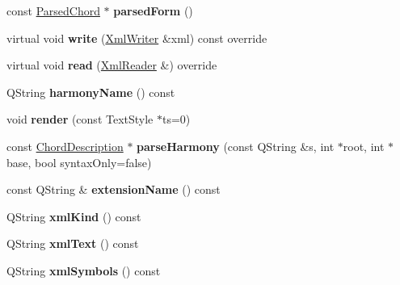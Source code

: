 \begin{DoxyCompactItemize}
\item 
\mbox{\label{class_ms_1_1_harmony_ac8c4ea2022b14c592fa6c61788785835}} 
const \hyperlink{class_ms_1_1_parsed_chord}{Parsed\+Chord} $\ast$ {\bfseries parsed\+Form} ()
\item 
\mbox{\label{class_ms_1_1_harmony_a90bcf02fdd768b6c5132cd0216c039d0}} 
virtual void {\bfseries write} (\hyperlink{class_ms_1_1_xml_writer}{Xml\+Writer} \&xml) const override
\item 
\mbox{\label{class_ms_1_1_harmony_a5aafd55c30ccc85bec5f9378721f9f09}} 
virtual void {\bfseries read} (\hyperlink{class_ms_1_1_xml_reader}{Xml\+Reader} \&) override
\item 
\mbox{\label{class_ms_1_1_harmony_a765bb29a27d0027515bea6fb79ee2e57}} 
Q\+String {\bfseries harmony\+Name} () const
\item 
\mbox{\label{class_ms_1_1_harmony_a0fa16fdfc1e16586d2f726f82c5a4c1c}} 
void {\bfseries render} (const Text\+Style $\ast$ts=0)
\item 
\mbox{\label{class_ms_1_1_harmony_a8049e66f9912d843a671d498580cab2f}} 
const \hyperlink{struct_ms_1_1_chord_description}{Chord\+Description} $\ast$ {\bfseries parse\+Harmony} (const Q\+String \&s, int $\ast$root, int $\ast$base, bool syntax\+Only=false)
\item 
\mbox{\label{class_ms_1_1_harmony_a6f38a0ec9ddca4dee686df60a1e9d63f}} 
const Q\+String \& {\bfseries extension\+Name} () const
\item 
\mbox{\label{class_ms_1_1_harmony_a02eb418f41d80763738390e460149f4d}} 
Q\+String {\bfseries xml\+Kind} () const
\item 
\mbox{\label{class_ms_1_1_harmony_a32d11e48d0427f964008166a732f10b5}} 
Q\+String {\bfseries xml\+Text} () const
\item 
\mbox{\label{class_ms_1_1_harmony_a9e948a231128c3023b45593a12a4caf6}} 
Q\+String {\bfseries xml\+Symbols} () const

\end{DoxyCompactItemize}

